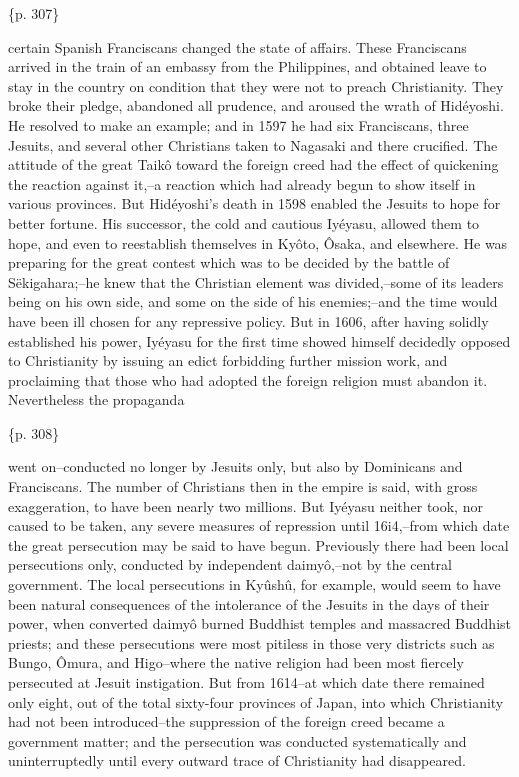 \{p. 307\}

certain Spanish Franciscans changed the state of affairs. These Franciscans arrived in the train of an embassy from the Philippines, and obtained leave to stay in the country on condition that they were not to preach Christianity. They broke their pledge, abandoned all prudence, and aroused the wrath of Hidéyoshi. He resolved to make an example; and in 1597 he had six Franciscans, three Jesuits, and several other Christians taken to Nagasaki and there crucified. The attitude of the great Taikô toward the foreign creed had the effect of quickening the reaction against it,--a reaction which had already begun to show itself in various provinces. But Hidéyoshi's death in 1598 enabled the Jesuits to hope for better fortune. His successor, the cold and cautious Iyéyasu, allowed them to hope, and even to reestablish themselves in Kyôto, Ôsaka, and elsewhere. He was preparing for the great contest which was to be decided by the battle of Sëkigahara;--he knew that the Christian element was divided,--some of its leaders being on his own side, and some on the side of his enemies;--and the time would have been ill chosen for any repressive policy. But in 1606, after having solidly established his power, Iyéyasu for the first time showed himself decidedly opposed to Christianity by issuing an edict forbidding further mission work, and proclaiming that those who had adopted the foreign religion must abandon it. Nevertheless the propaganda

\{p. 308\}

went on--conducted no longer by Jesuits only, but also by Dominicans and Franciscans. The number of Christians then in the empire is said, with gross exaggeration, to have been nearly two millions. But Iyéyasu neither took, nor caused to be taken, any severe measures of repression until 16i4,--from which date the great persecution may be said to have begun. Previously there had been local persecutions only, conducted by independent daimyô,--not by the central government. The local persecutions in Kyûshû, for example, would seem to have been natural consequences of the intolerance of the Jesuits in the days of their power, when converted daimyô burned Buddhist temples and massacred Buddhist priests; and these persecutions were most pitiless in those very districts such as Bungo, Ômura, and Higo--where the native religion had been most fiercely persecuted at Jesuit instigation. But from 1614--at which date there remained only eight, out of the total sixty-four provinces of Japan, into which Christianity had not been introduced--the suppression of the foreign creed became a government matter; and the persecution was conducted systematically and uninterruptedly until every outward trace of Christianity had disappeared.



